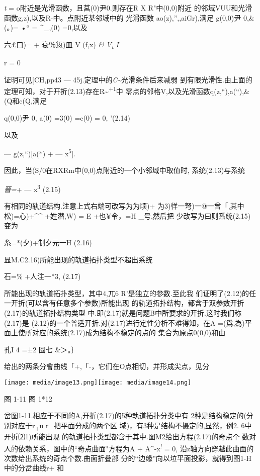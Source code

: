 \documentclass{article}
\begin{document}
\emph{t} = o附近是光滑函数，且莒(0)尹0.则存在R X R"中(0,0)附近
的邻域VUU和光滑函数g,z),以及R-中。点附近某邻域中的 光滑函数
ao(z),'',,aiGr),满足 g(0,0)尹 0,\&(。)= •`` = \^{}\_,(0) =0,以及

六£口)= + 袞％愆)皿 V (f,x) \emph{\& V\textsubscript{t} I}

r = 0

证明可见{[}CH,pp43 ---
45j.定理中的\emph{C\textasciitilde{}}光滑条件后来减弱
到有限光滑性.由上面的定理可知，对于开折(2.13)存在R\textasciitilde{}\textsuperscript{+1}中
零点的邻格V,以及光滑函数q(z,``),a(``),\&(Q和c(Q,满足

q(0,0)尹 0, a(0) =3(0) =c(0) = 0, '(2.14)

以及

--- g(z,``){[}a(*) + --- x\textsuperscript{5}{]}.

因此，当(S/0在RXRm中(0,0)点附近的一个小邻域中取值时, 系统(2.13)与系统

\emph{晉=}+ --- x\textsuperscript{3} (2.15)

有相同的轨道结构.注意上式右端可改写为为顷)+
为3)徉一弩)一@一曾「,其中松)=心)+\^{}\^{} +姓潛,W) = E +也¥令，=H
\_号,然后把 少改写为曰则系统(2.15)变为

糸=*(夕)+制夕元一H (2.16)

显M.C2.16)所能出现的轨道拓扑类型不超出系统

石=\% +人注一*3, (2.17)

所能出现的轨道拓扑类型，其中4,兀6 R'是独立的参数.至此我
们证明了(2.12)的任一开折(可以含有任意多个参数)所能出现
的轨道拓扑结构，都含于双参数开折(2.17)的轨道拓扑结构类型
中.即(2.17)就是问题B中所要求的开折.这时我们称(2.17)是
(2.12)的一个普适开折.对(2.17)进行定性分析不难得知，在A
=(爲,為)平面上使所对应的系统(2.17)成为结构不稳定的点的
集合为原点0(0,0)和由

孔I 4 =±2 囹七 \&＞。｝

给出的两条分會曲线「+,「-，它们在O点相切，并形成尖点，见分

\texttt{[image: media/image13.png]}\texttt{[image: media/image14.png]}

图 1-11 图 1*12

岔图1-11.相应于不同的A,开折(2.17)的5种執道拓扑分类中有
2种是结构稳定的(分别对应于r\textsubscript{+}u r\_把平面分成的两个区
域)，有3种是结构不摄定的,显然，例2. 6中开折⑵1)所能出现
的轨道拓扑类型都含于其中.图M2给出方程(2.17)的奇点个
数对人的依赖关系，图中的``奇点曲面"方程为A + A\^{}-x\textsuperscript{!}
= 0, 沿z轴方向穿越此曲面的次数给出系统的奇点个数.曲面折叠部
分的``边缘''向以垃平面投影，就得到图1-H中的分岔曲线r+ 和
\end{document}
